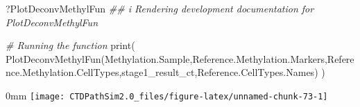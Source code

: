 \documentclass[]{article}
\newcommand{\hlcom}[1]{\textcolor[rgb]{0.502,0.502,0.502}{\textit{#1}}}%
\newcommand{\hlstd}[1]{\textcolor[rgb]{0.251,0.251,0.251}{#1}}%
\newenvironment{Shaded}{\begin{myshaded}}{\end{myshaded}}
\newcommand{\CommentTok}[1]{\hlcom{#1}}
\newcommand{\DocumentationTok}[1]{\hlcom{#1}}
\newcommand{\FunctionTok}[1]{\hlstd{#1}}
\newcommand{\NormalTok}[1]{\hlstd{#1}}
\begin{document}
\begin{Shaded}
\begin{Highlighting}[]
\NormalTok{?PlotDeconvMethylFun}
\DocumentationTok{\#\# i Rendering development documentation for \textquotesingle{}PlotDeconvMethylFun\textquotesingle{}}
\end{Highlighting}
\end{Shaded}

\begin{Shaded}
\begin{Highlighting}[]
\CommentTok{\# Running the function}
\FunctionTok{print}\NormalTok{(}
\FunctionTok{PlotDeconvMethylFun}\NormalTok{(Methylation.Sample,Reference.Methylation.Markers,Reference.Methylation.CellTypes,stage1\_result\_ct,Reference.CellTypes.Names)}
\NormalTok{)}
\end{Highlighting}
\end{Shaded}

\begin{adjustwidth}{\fltoffset}{0mm}
\texttt{[image: CTDPathSim2.0\_files/figure-latex/unnamed-chunk-73-1]} \end{adjustwidth}
\end{document}
